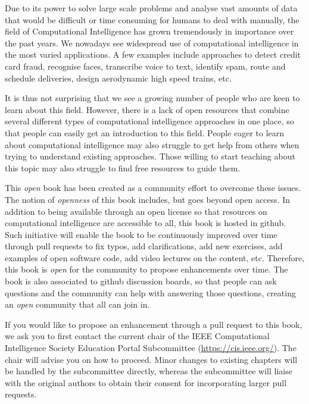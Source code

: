 %
%

\preface

Due to its power to solve large scale problems and analyse vast amounts of data that would be difficult or time consuming for humans to deal with manually, the field of Computational Intelligence has grown tremendously in importance over the past years. We nowadays see widespread use of computational intelligence in the most varied applications. A few examples include approaches to detect credit card fraud, recognise faces, transcribe voice to text, identify spam, route and schedule deliveries, design aerodynamic high speed trains, etc. 

It is thus not surprising that we see a growing number of people who are keen to learn about this field. However, there is a lack of open resources that combine several different types of computational intelligence approaches in one place, so that people can easily get an introduction to this field. People eager to learn about computational intelligence may also struggle to get help from others when trying to understand existing approaches. Those willing to start teaching about this topic may also struggle to find free resources to guide them. 

This \textit{open} book has been created as a community effort to overcome these issues. The notion of \textit{openness} of this book includes, but goes beyond open access. In addition to being available through an open license so that resources on computational intelligence are accessible to all, this book is hosted in github. Such initiative will enable the book to be continuously improved over time through pull requests to fix typos, add clarifications, add new exercises, add examples of open software code, add video lectures on the content, etc. Therefore, this book is \textit{open} for the community to propose enhancements over time. The book is also associated to github discussion boards, so that people can ask questions and the community can help with answering those questions, creating an \textit{open} community that all can join in. 

If you would like to propose an enhancement through a pull request to this book, we ask you to first contact the current chair of the IEEE Computational Intelligence Society Education Portal Subcommittee (\url{https://cis.ieee.org/}). The chair will advise you on how to proceed. Minor changes to existing chapters will be handled by the subcommittee directly, whereas the subcommittee will liaise with the original authors to obtain their consent for incorporating larger pull requests. 

